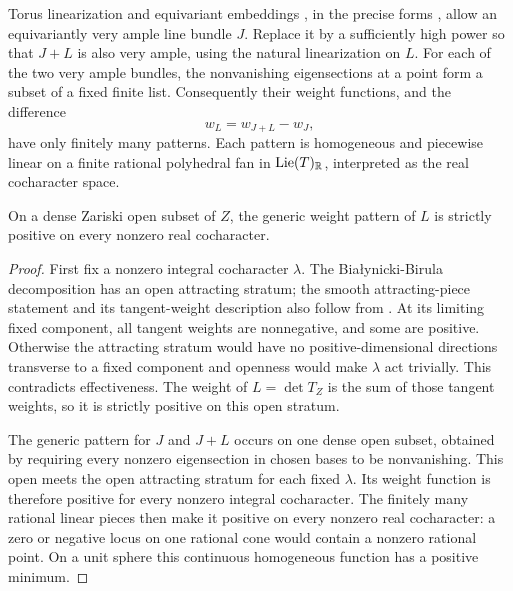 Torus linearization and equivariant embeddings \cite{Sumihiro1974}, in the precise forms \cite[Proposition~2.4 and Corollary~2.6]{KKLV1989}, allow an equivariantly very ample line bundle $J$. Replace it by a sufficiently high power so that $J+L$ is also very ample, using the natural linearization on $L$. For each of the two very ample bundles, the nonvanishing eigensections at a point form a subset of a fixed finite list. Consequently their weight functions, and the difference
\[
w_L=w_{J+L}-w_J,
\]
have only finitely many patterns. Each pattern is homogeneous and piecewise linear on a finite rational polyhedral fan in $\operatorname{Lie}(T)_{\mathbb R}$, interpreted as the real cocharacter space.

\begin{lemma}\label{lem:genericweight}
On a dense Zariski open subset of $Z$, the generic weight pattern of $L$ is strictly positive on every nonzero real cocharacter.
\end{lemma}
\begin{proof}
First fix a nonzero integral cocharacter $\lambda$. The Bia\l{}ynicki-Birula decomposition \cite{BB1973} has an open attracting stratum; the smooth attracting-piece statement and its tangent-weight description also follow from \cite[Theorem~1.5 and Corollary~7.3]{JS2018}. At its limiting fixed component, all tangent weights are nonnegative, and some are positive. Otherwise the attracting stratum would have no positive-dimensional directions transverse to a fixed component and openness would make $\lambda$ act trivially. This contradicts effectiveness. The weight of $L=\det T_Z$ is the sum of those tangent weights, so it is strictly positive on this open stratum.

The generic pattern for $J$ and $J+L$ occurs on one dense open subset, obtained by requiring every nonzero eigensection in chosen bases to be nonvanishing. This open meets the open attracting stratum for each fixed $\lambda$. Its weight function is therefore positive for every nonzero integral cocharacter. The finitely many rational linear pieces then make it positive on every nonzero real cocharacter: a zero or negative locus on one rational cone would contain a nonzero rational point. On a unit sphere this continuous homogeneous function has a positive minimum.
\end{proof}

